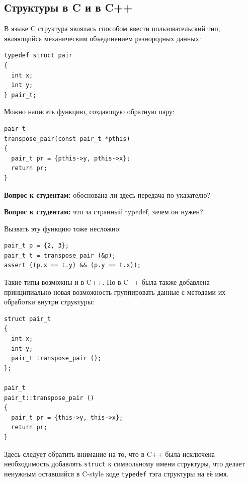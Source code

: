 \documentclass[a4paper,12pt,oneside]{article}
\newif\ifanswers
\begin{document}
\subsection{Структуры в C и в C++}\label{CCppStructs}

В языке C структура являлась способом ввести пользовательский тип, являющийся механическим объединением разнородных данных:

\begin{lstlisting}
typedef struct pair 
{ 
  int x; 
  int y; 
} pair_t;
\end{lstlisting}

Можно написать функцию, создающую обратную пару:

\begin{lstlisting}
pair_t 
transpose_pair(const pair_t *pthis)
{
  pair_t pr = {pthis->y, pthis->x};
  return pr;
} 
\end{lstlisting}

\textbf{Вопрос к студентам:} обоснована ли здесь передача по указателю?

\ifanswers
Правильный ответ: на грани. Указатель может занимать больше места, чем два целых, может и меньше.
\fi

\textbf{Вопрос к студентам:} что за странный typedef, зачем он нужен?

\ifanswers
Правильный ответ: это стандартная идиома, чтобы в коде на C не писать лишний раз \lstinline!struct pair! в два слова.
\fi

Вызвать эту функцию тоже несложно:

\begin{lstlisting}
pair_t p = {2, 3};
pair_t t = transpose_pair (&p);
assert ((p.x == t.y) && (p.y == t.x));
\end{lstlisting}

Такие типы возможны и в C++. Но в C++ была также добавлена принципиально новая возможность группировать данные с методами их обработки внутри структуры:

\begin{lstlisting}
struct pair_t 
{ 
  int x; 
  int y;
  pair_t transpose_pair (); 
};

pair_t 
pair_t::transpose_pair ()
{
  pair_t pr = {this->y, this->x};
  return pr;
} 
\end{lstlisting}

Здесь следует обратить внимание на то, что в C++ была исключена необходимость добавлять \lstinline!struct! к символьному имени структуры, что делает ненужным оставшийся в C-style коде \lstinline!typedef! тэга структуры на её имя.
\end{document}
